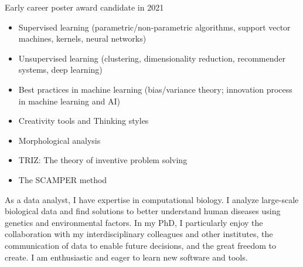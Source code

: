 \documentclass[10pt, a4paper, normalphoto]{altacv}
\begin{document}
\begin{fullwidth}
\bigskip


Early career poster award candidate in 2021

\divider


\medskip


\begin{itemize}
\item Supervised learning (parametric/non-parametric algorithms, support vector machines, kernels, neural networks)
\item Unsupervised learning (clustering, dimensionality reduction, recommender systems, deep learning)
\item Best practices in machine learning (bias/variance theory; innovation process in machine learning and AI)
\end{itemize}
\divider

\begin{itemize}
\item Creativity tools and Thinking styles
\item Morphological analysis  
\item TRIZ: The theory of inventive problem solving
\item The SCAMPER method
\end{itemize}
\divider


As a data analyst, I have expertise in computational biology. I analyze large-scale biological data and find solutions to better understand human diseases using genetics and environmental factors. In my PhD, I particularly enjoy the collaboration with my interdisciplinary colleagues and other institutes, the communication of data to enable future decisions, and the great freedom to create. I am enthusiastic and eager to learn new software and tools.

\end{fullwidth}
\clearpage


\end{document}

